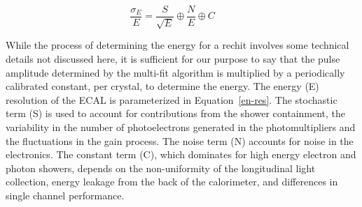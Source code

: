 \begin{equation}\label{en-res}
\label{e1}\frac{\sigma_{E}}{E} = \frac{S}{\sqrt{E}} \oplus \frac{N}{E} \oplus C \qquad
\end{equation}

While the process of determining the energy for a rechit involves some technical details not discussed here, it is sufficient for our purpose to say that the pulse amplitude determined by the multi-fit algorithm is multiplied by a periodically calibrated constant, per crystal, to determine the energy. The energy (E) resolution of the ECAL is parameterized in Equation~\ref{en-res}. The stochastic term (S) is used to account for contributions from the shower containment, the variability in the number of photoelectrons generated in the photomultipliers and the fluctuations in the gain process. The noise term (N) accounts for noise in the electronics. The constant term (C), which dominates for high energy electron and photon showers, depends on the non-uniformity of the longitudinal light collection, energy leakage from the back of the calorimeter, and differences in single channel performance.

